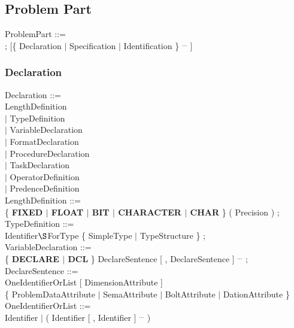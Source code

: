 \subsection{Problem Part}   %

ProblemPart ::=\\
; [\{ Declaration $\mid$ Specification $\mid$ Identification \} $^{...}$ ]\\

\subsubsection{Declaration}    %

Declaration ::=\\
\x LengthDefinition \\
\x $\mid$ TypeDefinition\\
\x $\mid$ VariableDeclaration\\
\x $\mid$ FormatDeclaration\\
\x $\mid$ ProcedureDeclaration\\
\x $\mid$ TaskDeclaration\\
\x $\mid$ OperatorDefinition\\
\x $\mid$ PredenceDefinition\\

LengthDefinition ::=\\
 \{ {\bf FIXED $\mid$ FLOAT $\mid$ BIT $\mid$ CHARACTER $\mid$ CHAR} \} ( Precision ) ;\\

TypeDefinition ::=\\
 Identifier$\S $ForType \{ SimpleType $\mid$ TypeStructure \} ;\\

VariableDeclaration ::=\\
\x \{ {\bf DECLARE $\mid$ DCL} \} DeclareSentence [ , DeclareSentence ] $^{...}$ ;\\

DeclareSentence ::=\\
\x OneIdentifierOrList [ DimensionAttribute ]\\
\x \{ ProblemDataAttribute $\mid$ SemaAttribute $\mid$ BoltAttribute $\mid$ DationAttribute \}\\ 

OneIdentifierOrList ::= \\
\x Identifier $\mid$ ( Identifier [ , Identifier ] $^{...}$ ) \\

